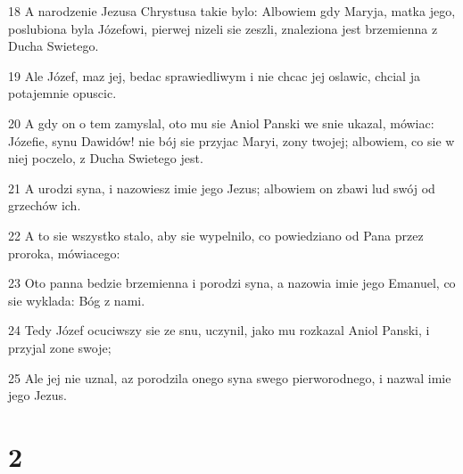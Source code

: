 \par 18 A narodzenie Jezusa Chrystusa takie bylo: Albowiem gdy Maryja, matka jego, poslubiona byla Józefowi, pierwej nizeli sie zeszli, znaleziona jest brzemienna z Ducha Swietego.
\par 19 Ale Józef, maz jej, bedac sprawiedliwym i nie chcac jej oslawic, chcial ja potajemnie opuscic.
\par 20 A gdy on o tem zamyslal, oto mu sie Aniol Panski we snie ukazal, mówiac: Józefie, synu Dawidów! nie bój sie przyjac Maryi, zony twojej; albowiem, co sie w niej poczelo, z Ducha Swietego jest.
\par 21 A urodzi syna, i nazowiesz imie jego Jezus; albowiem on zbawi lud swój od grzechów ich.
\par 22 A to sie wszystko stalo, aby sie wypelnilo, co powiedziano od Pana przez proroka, mówiacego:
\par 23 Oto panna bedzie brzemienna i porodzi syna, a nazowia imie jego Emanuel, co sie wyklada: Bóg z nami.
\par 24 Tedy Józef ocuciwszy sie ze snu, uczynil, jako mu rozkazal Aniol Panski, i przyjal zone swoje;
\par 25 Ale jej nie uznal, az porodzila onego syna swego pierworodnego, i nazwal imie jego Jezus.

\chapter{2}

